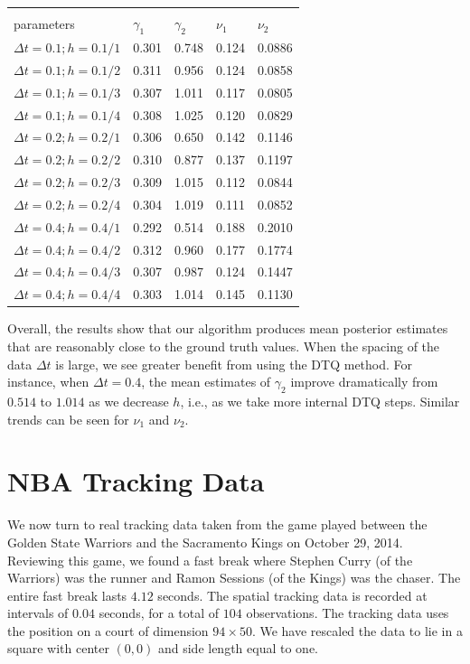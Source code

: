 \documentclass[graybox]{svmult}
\begin{document}
\vspace{-4mm}
\setlength{\tabcolsep}{12pt}
\begin{center}
\begin{tabular}{lllll}
\\[-1.8ex]\hline 
\hline \\[-1.8ex]
        parameters & $\gamma_1$ & $\gamma_2$ & $\nu_1$ & $\nu_2$ \\ \hline
 $\Delta t=0.1; h=0.1/1$  &   0.301  &   0.748 & 0.124 & 0.0886 \\ 
  $\Delta t=0.1; h=0.1/2$  &   0.311  &   0.956 & 0.124 & 0.0858\\ 
  $\Delta t=0.1; h=0.1/3$  &   0.307  &   1.011 & 0.117 & 0.0805\\
  $\Delta t=0.1; h=0.1/4$  &   0.308  &   1.025 & 0.120 & 0.0829 \\ \hline
  $\Delta t=0.2; h=0.2/1$  &   0.306  &   0.650 & 0.142 & 0.1146 \\
  $\Delta t=0.2; h=0.2/2$  &   0.310  &   0.877 & 0.137 & 0.1197 \\
  $\Delta t=0.2; h=0.2/3$  &   0.309  &   1.015 & 0.112 & 0.0844 \\
  $\Delta t=0.2; h=0.2/4$  &   0.304  &   1.019 & 0.111 & 0.0852 \\ \hline
  $\Delta t=0.4; h=0.4/1$  &   0.292  &   0.514 & 0.188 & 0.2010 \\ 
 $\Delta t=0.4; h=0.4/2$  &   0.312  &   0.960 & 0.177 & 0.1774 \\
 $\Delta t=0.4; h=0.4/3$  &   0.307  &   0.987 & 0.124 & 0.1447 \\
 $\Delta t=0.4; h=0.4/4$  &   0.303  &   1.014 & 0.145 & 0.1130
\end{tabular}
\end{center}

Overall, the results show that our algorithm produces mean posterior
estimates that are reasonably close to the ground truth values.  When
the spacing of the data $\Delta t$ is large, we see greater benefit
from using the DTQ method.  For instance, when $\Delta t = 0.4$, the
mean estimates of $\gamma_2$ improve dramatically from $0.514$ to
$1.014$ as we decrease $h$, i.e., as we take more internal DTQ steps.
Similar trends can be seen for $\nu_1$ and $\nu_2$.

\section{NBA Tracking Data}
We now turn to real tracking data taken from the game played between
the Golden State Warriors and the Sacramento Kings on October 29,
2014.  Reviewing this game, we found a fast break where Stephen Curry
(of the Warriors) was the runner and Ramon Sessions (of the Kings) was
the chaser.  The entire fast break lasts $4.12$ seconds.  The spatial
tracking data is recorded at intervals of $0.04$ seconds, for a total
of $104$ observations.  The tracking data uses the position on a court
of dimension $94 \times 50$.  We have rescaled the data to lie in a
square with center $(0,0)$ and side length equal to one.
\end{document}
